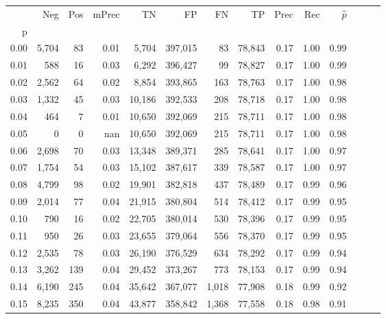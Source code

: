 \begin{tabular}{rrrrrrrrrrrrrr}
\toprule
{} &     Neg &    Pos & mPrec &       TN &       FP &      FN &      TP &  Prec &   Rec & $\hat{p}$ \\
p    &         &        &       &          &          &         &         &       &       &           \\
\midrule
0.00 &   5,704 &     83 &  0.01 &    5,704 &  397,015 &      83 &  78,843 &  0.17 &  1.00 &      0.99 \\
0.01 &     588 &     16 &  0.03 &    6,292 &  396,427 &      99 &  78,827 &  0.17 &  1.00 &      0.99 \\
0.02 &   2,562 &     64 &  0.02 &    8,854 &  393,865 &     163 &  78,763 &  0.17 &  1.00 &      0.98 \\
0.03 &   1,332 &     45 &  0.03 &   10,186 &  392,533 &     208 &  78,718 &  0.17 &  1.00 &      0.98 \\
0.04 &     464 &      7 &  0.01 &   10,650 &  392,069 &     215 &  78,711 &  0.17 &  1.00 &      0.98 \\
0.05 &       0 &      0 &   nan &   10,650 &  392,069 &     215 &  78,711 &  0.17 &  1.00 &      0.98 \\
0.06 &   2,698 &     70 &  0.03 &   13,348 &  389,371 &     285 &  78,641 &  0.17 &  1.00 &      0.97 \\
0.07 &   1,754 &     54 &  0.03 &   15,102 &  387,617 &     339 &  78,587 &  0.17 &  1.00 &      0.97 \\
0.08 &   4,799 &     98 &  0.02 &   19,901 &  382,818 &     437 &  78,489 &  0.17 &  0.99 &      0.96 \\
0.09 &   2,014 &     77 &  0.04 &   21,915 &  380,804 &     514 &  78,412 &  0.17 &  0.99 &      0.95 \\
0.10 &     790 &     16 &  0.02 &   22,705 &  380,014 &     530 &  78,396 &  0.17 &  0.99 &      0.95 \\
0.11 &     950 &     26 &  0.03 &   23,655 &  379,064 &     556 &  78,370 &  0.17 &  0.99 &      0.95 \\
0.12 &   2,535 &     78 &  0.03 &   26,190 &  376,529 &     634 &  78,292 &  0.17 &  0.99 &      0.94 \\
0.13 &   3,262 &    139 &  0.04 &   29,452 &  373,267 &     773 &  78,153 &  0.17 &  0.99 &      0.94 \\
0.14 &   6,190 &    245 &  0.04 &   35,642 &  367,077 &   1,018 &  77,908 &  0.18 &  0.99 &      0.92 \\
0.15 &   8,235 &    350 &  0.04 &   43,877 &  358,842 &   1,368 &  77,558 &  0.18 &  0.98 &      0.91 \\

\end{tabular}
